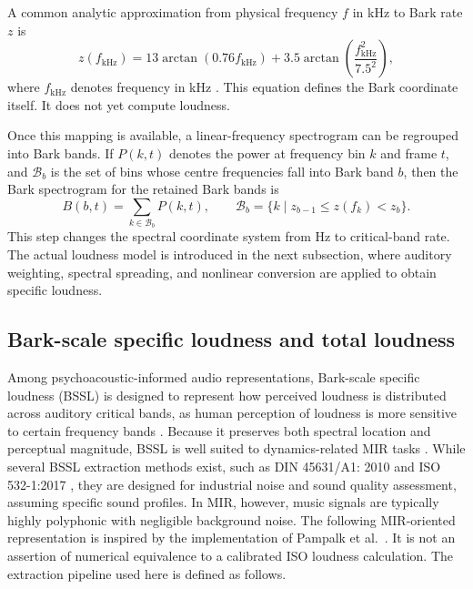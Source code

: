 A common analytic approximation from physical frequency $f$ in kHz to Bark rate $z$ is
\begin{equation}
z(f_{\mathrm{kHz}}) = 13\arctan(0.76 f_{\mathrm{kHz}}) + 3.5\arctan\!\left(\frac{f_{\mathrm{kHz}}^2}{7.5^2}\right),
\label{eq:bg:bark_mapping}
\end{equation}
where $f_{\mathrm{kHz}}$ denotes frequency in kHz \cite{pampalk2002content,pampalk2004exploring,zwicker1999psychoacoustics}. This equation defines the Bark coordinate itself. It does not yet compute loudness. 

Once this mapping is available, a linear-frequency spectrogram can be regrouped into Bark bands. If $P(k,t)$ denotes the power at frequency bin $k$ and frame $t$, and $\mathcal{B}_b$ is the set of bins whose centre frequencies fall into Bark band $b$, then the Bark spectrogram for the retained Bark bands is
\begin{equation}
B(b,t) = \sum_{k \in \mathcal{B}_b} P(k,t),
\qquad
\mathcal{B}_b = \{k \mid z_{b-1} \le z(f_k) < z_b\}.
\label{eq:bg:bark_spectrogram}
\end{equation}
This step changes the spectral coordinate system from Hz to critical-band rate. The actual loudness model is introduced in the next subsection, where auditory weighting, spectral spreading, and nonlinear conversion are applied to obtain specific loudness.


\subsection{Bark-scale specific loudness and total loudness}
Among psychoacoustic-informed audio representations, Bark-scale specific loudness (BSSL) is designed to represent how perceived loudness is distributed across auditory critical bands, as human perception of loudness is more sensitive to certain frequency bands \cite{zwicker1999psychoacoustics,zwicker2007psychoacoustics}. Because it preserves both spectral location and perceptual magnitude, BSSL is well suited to dynamics-related MIR tasks \cite{narang2024automatic,he2026dynest}. While several BSSL extraction methods exist, such as DIN 45631/A1: 2010 \cite{din45631a1_2010} and ISO 532-1:2017 \cite{iso532_1_2017}, they are designed for industrial noise and sound quality assessment, assuming specific sound profiles. In MIR, however, music signals are typically highly polyphonic with negligible background noise. The following MIR-oriented representation is inspired by the implementation of Pampalk et al.~\cite{pampalk2002content,pampalk2004exploring,pampalk2004toolbox}. It is not an assertion of numerical equivalence to a calibrated ISO loudness calculation. The extraction pipeline used here is defined as follows.

